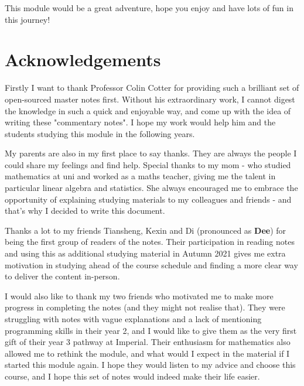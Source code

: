 \documentclass[a4paper,11pt,twoside]{report}
\begin{document}
This module would be a great adventure, hope you enjoy and have lots of fun in this journey!

\chapter*{Acknowledgements}
Firstly I want to thank Professor Colin Cotter for providing such a brilliant set of open-sourced master notes first.
Without his extraordinary work, I cannot digest the knowledge in such a quick and enjoyable way, and come up with the idea of writing these "commentary notes". 
I hope my work would help him and the students studying this module in the following years.\smallskip

My parents are also in my first place to say thanks. They are always the people I could share my feelings and find help. Special thanks to my mom - who studied mathematics at uni and worked as a maths teacher, giving me the talent in particular linear algebra and statistics. She always encouraged me to embrace the opportunity of explaining studying materials to my colleagues and friends - and that's why I decided to write this document.\smallskip

Thanks a lot to my friends Tiansheng, Kexin and Di (pronounced as \textbf{Dee}) for being the first group of readers of the notes. Their participation in reading notes and using this as additional studying material in Autumn 2021 gives me extra motivation in studying ahead of the course schedule and finding a more clear way to deliver the content in-person.\smallskip

I would also like to thank my two friends who motivated me to make more progress in completing the notes (and they might not realise that). They were struggling with notes with vague explanations and a lack of mentioning programming skills in their year 2, and I would like to give them as the very first gift of their year 3 pathway at Imperial. Their enthusiasm for mathematics also allowed me to rethink the module, and what would I expect in the material if I started this module again. I hope they would listen to my advice and choose this course, and I hope this set of notes would indeed make their life easier.
\tableofcontents

\end{document}
